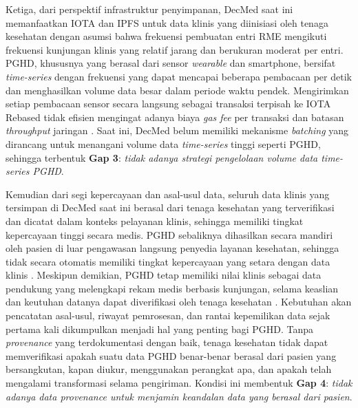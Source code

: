 Ketiga, dari perspektif infrastruktur penyimpanan, DecMed saat ini memanfaatkan IOTA dan IPFS untuk data klinis yang diinisiasi oleh tenaga kesehatan dengan asumsi bahwa frekuensi pembuatan entri RME mengikuti frekuensi kunjungan klinis yang relatif jarang dan berukuran moderat per entri. 
PGHD, khususnya yang berasal dari sensor \textit{wearable} dan smartphone, bersifat \textit{time-series} dengan frekuensi yang dapat mencapai beberapa pembacaan per detik dan menghasilkan volume data besar dalam periode waktu pendek. 
Mengirimkan setiap pembacaan sensor secara langsung sebagai transaksi terpisah ke IOTA Rebased tidak efisien mengingat adanya biaya \textit{gas fee} per transaksi dan batasan \textit{throughput} jaringan \parencite{FromTangleToRebased_2025}. 
Saat ini, DecMed belum memiliki mekanisme \textit{batching} yang dirancang untuk menangani volume data \textit{time-series} tinggi seperti PGHD, sehingga terbentuk \textbf{Gap 3}: \emph{tidak adanya strategi pengelolaan volume data \textit{time-series} PGHD}.

Kemudian dari segi kepercayaan dan asal-usul data, seluruh data klinis yang tersimpan di DecMed saat ini berasal dari tenaga kesehatan yang terverifikasi dan dicatat dalam konteks pelayanan klinis, sehingga memiliki tingkat kepercayaan tinggi secara medis. 
PGHD sebaliknya dihasilkan secara mandiri oleh pasien di luar pengawasan langsung penyedia layanan kesehatan, sehingga tidak secara otomatis memiliki tingkat kepercayaan yang setara dengan data klinis \parencite{Khatiwada_Yang_Lin_Blobel_2024_PGHD_Understanding}.
Meskipun demikian, PGHD tetap memiliki nilai klinis sebagai data pendukung yang melengkapi rekam medis berbasis kunjungan, selama keaslian dan keutuhan datanya dapat diverifikasi oleh tenaga kesehatan \parencite{ahima_fountain_2014_using_pghd_provenance}.
Kebutuhan akan pencatatan asal-usul, riwayat pemrosesan, dan rantai kepemilikan data sejak pertama kali dikumpulkan menjadi hal yang penting bagi PGHD\@ \parencite{Ahmed_2023_Data_Provenance}. 
Tanpa \textit{provenance} yang terdokumentasi dengan baik, tenaga kesehatan tidak dapat memverifikasi apakah suatu data PGHD benar-benar berasal dari pasien yang bersangkutan, kapan diukur, menggunakan perangkat apa, dan apakah telah mengalami transformasi selama pengiriman.
Kondisi ini membentuk \textbf{Gap 4}: \emph{tidak adanya \textit{data provenance} untuk menjamin keandalan data yang berasal dari pasien}.

